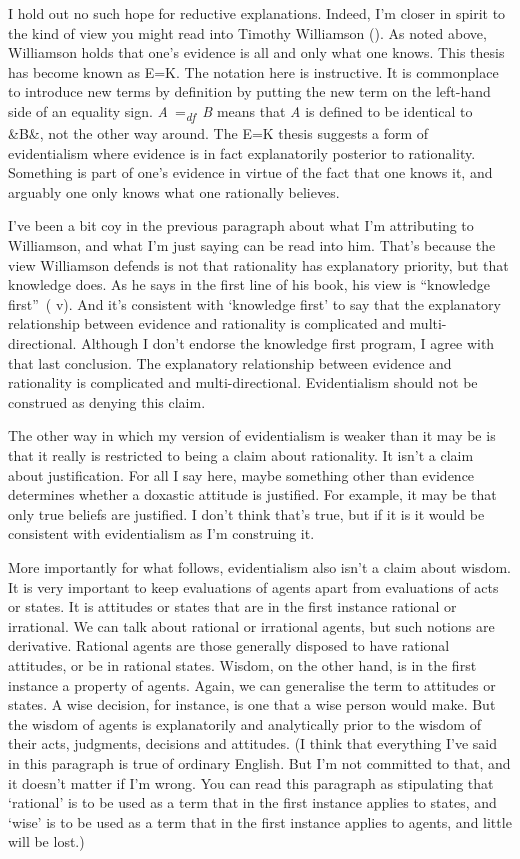 \documentclass[
  11pt,
  letterpaper,
  DIV=11,
  numbers=noendperiod,
  twoside]{scrartcl}
\begin{document}
I hold out no such hope for reductive explanations. Indeed, I'm closer
in spirit to the kind of view you might read into Timothy Williamson
(). As noted above, Williamson holds
that one's evidence is all and only what one knows. This thesis has
become known as E=K. The notation here is instructive. It is commonplace
to introduce new terms by definition by putting the new term on the
left-hand side of an equality sign.
\emph{A}~=\textsubscript{\emph{df}}~\emph{B} means that \emph{A} is
defined to be identical to \&B\&, not the other way around. The E=K
thesis suggests a form of evidentialism where evidence is in fact
explanatorily posterior to rationality. Something is part of one's
evidence in virtue of the fact that one knows it, and arguably one only
knows what one rationally believes.

I've been a bit coy in the previous paragraph about what I'm attributing
to Williamson, and what I'm just saying can be read into him. That's
because the view Williamson defends is not that rationality has
explanatory priority, but that knowledge does. As he says in the first
line of his book, his view is ``knowledge
first''~( v). And it's
consistent with `knowledge first' to say that the explanatory
relationship between evidence and rationality is complicated and
multi-directional. Although I don't endorse the knowledge first program,
I agree with that last conclusion. The explanatory relationship between
evidence and rationality is complicated and multi-directional.
Evidentialism should not be construed as denying this claim.

The other way in which my version of evidentialism is weaker than it may
be is that it really is restricted to being a claim about rationality.
It isn't a claim about justification. For all I say here, maybe
something other than evidence determines whether a doxastic attitude is
justified. For example, it may be that only true beliefs are justified.
I don't think that's true, but if it is it would be consistent with
evidentialism as I'm construing it.

More importantly for what follows, evidentialism also isn't a claim
about wisdom. It is very important to keep evaluations of agents apart
from evaluations of acts or states. It is attitudes or states that are
in the first instance rational or irrational. We can talk about rational
or irrational agents, but such notions are derivative. Rational agents
are those generally disposed to have rational attitudes, or be in
rational states. Wisdom, on the other hand, is in the first instance a
property of agents. Again, we can generalise the term to attitudes or
states. A wise decision, for instance, is one that a wise person would
make. But the wisdom of agents is explanatorily and analytically prior
to the wisdom of their acts, judgments, decisions and attitudes. (I
think that everything I've said in this paragraph is true of ordinary
English. But I'm not committed to that, and it doesn't matter if I'm
wrong. You can read this paragraph as stipulating that `rational' is to
be used as a term that in the first instance applies to states, and
`wise' is to be used as a term that in the first instance applies to
agents, and little will be lost.)
\end{document}
